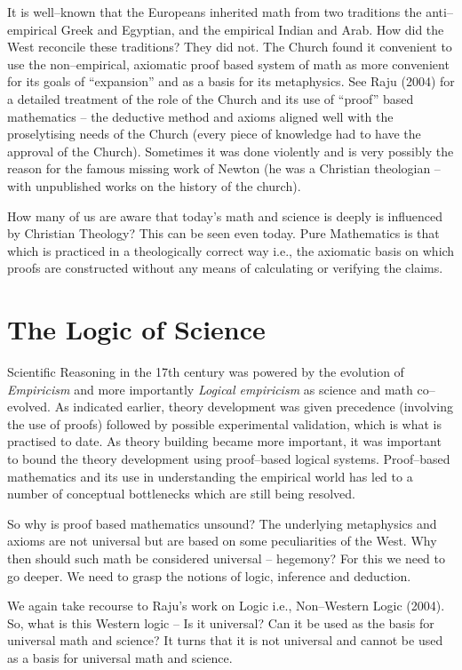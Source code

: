 It is well–known that the Europeans inherited math from two traditions the anti–empirical Greek and Egyptian, and the empirical Indian and Arab. How did the West reconcile these traditions? They did not. The Church found it convenient to use the non–empirical, axiomatic proof based system of math as more convenient for its goals of “expansion” and as a basis for its metaphysics. See Raju (2004) for a detailed treatment of the role of the Church and its use of “proof” based mathematics – the deductive method and axioms aligned well with the proselytising needs of the Church (every piece of knowledge had to have the approval of the Church). Sometimes it was done violently and is very possibly the reason for the famous missing work of Newton (he was a Christian theologian – with unpublished works on the history of the church).

How many of us are aware that today’s math and science is deeply is influenced by Christian Theology? This can be seen even today. Pure Mathematics is that which is practiced in a theologically correct way i.e., the axiomatic basis on which proofs are constructed without any means of calculating or verifying the claims.


\section*{The Logic of Science}

Scientific Reasoning in the 17th century was powered by the evolution of \textit{Empiricism} and more importantly \textit{Logical empiricism} as science and math co–evolved. As indicated earlier, theory development was given precedence (involving the use of proofs) followed by possible experimental validation, which is what is practised to date. As theory building became more important, it was important to bound the theory development using proof–based logical systems. Proof–based mathematics and its use in understanding the empirical world has led to a number of conceptual bottlenecks which are still being resolved.

\newpage

So why is proof based mathematics unsound? The underlying metaphysics and axioms are not universal but are based on some peculiarities of the West. Why then should such math be considered universal – hegemony? For this we need to go deeper. We need to grasp the notions of logic, inference and deduction.

We again take recourse to Raju’s work on Logic i.e., Non–Western Logic (2004). So, what is this Western logic – Is it universal? Can it be used as the basis for universal math and science? It turns that it is not universal and cannot be used as a basis for universal math and science.

